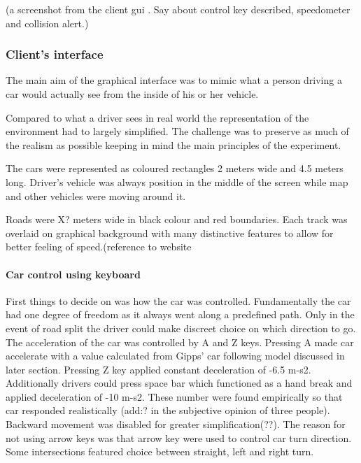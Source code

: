 \documentclass[11pt]{article}
\begin{document}
(a screenshot from the client gui . Say about control key described, speedometer and collision alert.)



\subsubsection{Client's interface}

The main aim of the graphical interface was to mimic what a person driving a car would actually see from the inside of his or her vehicle. 
 

Compared to what a driver sees in real world the representation of the environment had to largely simplified. The challenge was to preserve as much of the realism as possible keeping in mind the main principles of the experiment.

The cars were represented as coloured rectangles 2 meters wide and 4.5 meters long. Driver's vehicle was always position in the middle of the screen while map and other vehicles were moving around it.

Roads were X? meters wide in black colour and red boundaries. Each track was overlaid on graphical background with many distinctive features to allow for better feeling of speed.(reference to website %


\paragraph{Car control using keyboard}
First things to decide on was how the car was controlled.
Fundamentally the car had one degree of freedom as it always went along a predefined path. Only in the event of road split the driver could make discreet choice on which direction to go.
The acceleration of the car was controlled by A and Z keys. Pressing A made car accelerate with a value calculated from Gipps' car following model discussed in later section. Pressing Z key applied constant deceleration of -6.5 m-s2. Additionally drivers could press space bar which functioned as a hand break and applied deceleration of -10 m-s2. These number were found empirically so that car responded realistically (add:? in the subjective opinion of three people). Backward movement was disabled for greater simplification(??).
The reason for not using arrow keys was that arrow key were used to control car turn direction. Some intersections featured choice between straight, left and right turn. 
\end{document}
